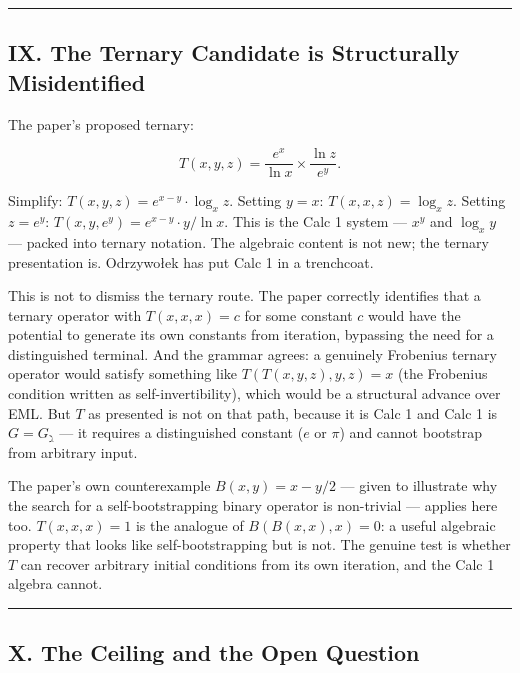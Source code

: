 \documentclass[12pt,a4paper]{article}
\begin{document}
\begin{center}
\rule{0.5\textwidth}{0.4pt}
\end{center}

\subsection{IX. The Ternary Candidate is Structurally Misidentified}

The paper's proposed ternary:


\[T(x,y,z) = \frac{e^x}{\ln x} \times \frac{\ln z}{e^y}.\]


Simplify: $T(x,y,z) = e^{x-y} \cdot \log_x z$. Setting $y = x$:
$T(x,x,z) = \log_x z$. Setting $z = e^y$: $T(x,y,e^y) = e^{x-y} \cdot y/\ln x$.
This is the Calc 1 system --- $x^y$ and $\log_x y$ --- packed into ternary notation.
The algebraic content is not new; the ternary presentation is. Odrzywołek has
put Calc 1 in a trenchcoat.

This is not to dismiss the ternary route. The paper correctly identifies that a
ternary operator with $T(x,x,x) = c$ for some constant $c$ would have the
potential to generate its own constants from iteration, bypassing the need for a
distinguished terminal. And the grammar agrees: a genuinely Frobenius ternary
operator would satisfy something like $T(T(x,y,z), y, z) = x$ (the Frobenius
condition written as self-invertibility), which would be a structural advance
over EML. But $T$ as presented is not on that path, because it is Calc 1 and
Calc 1 is $G = G_{\gimel}$ --- it requires a distinguished constant ($e$ or $\pi$)
and cannot bootstrap from arbitrary input.

The paper's own counterexample $B(x,y) = x - y/2$ --- given to illustrate why the
search for a self-bootstrapping binary operator is non-trivial --- applies here too.
$T(x,x,x) = 1$ is the analogue of $B(B(x,x),x) = 0$: a useful algebraic property
that looks like self-bootstrapping but is not. The genuine test is whether $T$ can
recover arbitrary initial conditions from its own iteration, and the Calc 1 algebra
cannot.

\begin{center}
\rule{0.5\textwidth}{0.4pt}
\end{center}

\subsection{X. The Ceiling and the Open Question}
\end{document}
